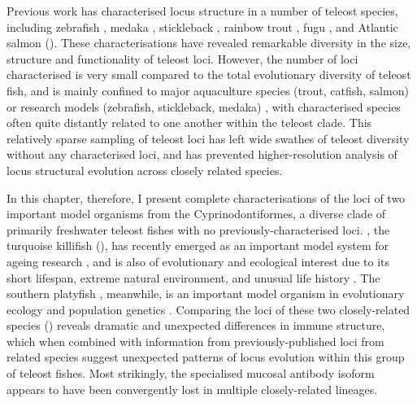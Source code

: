Previous work has characterised \igh{} locus structure in a number of teleost species, including zebrafish \parencite{danilova2005zebrafish}, medaka \parencite{magadan2011medaka}, stickleback \parencite{bao2010stickleback,gambondeza2011stickleback}, rainbow trout \parencite{hansen2005trout}, fugu \parencite{savan2005fugu}, and Atlantic salmon \parencite{yasuike2010salmon} (). These characterisations have revealed remarkable diversity in the size, structure and functionality of teleost \igh{} loci. However, the number of loci characterised is very small compared to the total evolutionary diversity of teleost fish, and is mainly confined to major aquaculture species (trout, catfish, salmon) or research models (zebrafish, stickleback, medaka) \parencite{fillatreau2013astonishing,bengten2015fishantibodies}, with characterised species often quite distantly related to one another within the teleost clade. This relatively sparse sampling of teleost \igh{} loci has left wide swathes of teleost diversity without any characterised \igh{} loci, and has prevented higher-resolution analysis of locus structural evolution across closely related species.

In this chapter, therefore, I present complete characterisations of the \igh{} loci of two important model organisms from the Cyprinodontiformes, a diverse clade of primarily freshwater teleost fishes with no previously-characterised \igh{} loci. \nfu, the turquoise killifish (), has recently emerged as an important model system for ageing research \parencite{harel2015platform,valenzano2015genome}, and is also of evolutionary and ecological interest due to its short lifespan, extreme natural environment, and unusual life history \parencite{cellerino2016bush}. The southern platyfish \xma, meanwhile, is an important model organism in evolutionary ecology and population genetics \parencite{schartl2013platyfish}. Comparing the \igh{} loci of these two closely-related species () reveals dramatic and unexpected differences in immune structure, which when combined with information from previously-published loci from related species suggest unexpected patterns of locus evolution within this group of teleost fishes. Most strikingly, the specialised mucosal antibody isoform  appears to have been convergently lost in multiple closely-related lineages. 

